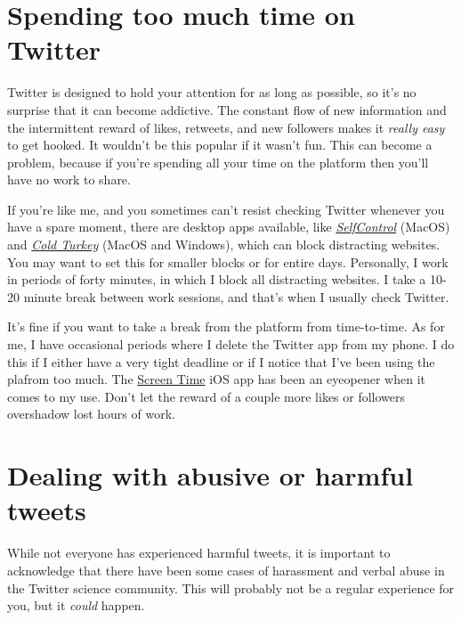 \documentclass[
]{book}
\begin{document}
\hypertarget{spending-too-much-time-on-twitter}{%
\section*{Spending too much time on Twitter}\label{spending-too-much-time-on-twitter}}

Twitter is designed to hold your attention for as long as possible, so it's no surprise that it can become addictive. The constant flow of new information and the intermittent reward of likes, retweets, and new followers makes it \emph{really easy} to get hooked. It wouldn't be this popular if it wasn't fun. This can become a problem, because if you're spending all your time on the platform then you'll have no work to share.

If you're like me, and you sometimes can't resist checking Twitter whenever you have a spare moment, there are desktop apps available, like \href{https://selfcontrolapp.com/}{\emph{SelfControl}} (MacOS) and \href{https://getcoldturkey.com/}{\emph{Cold Turkey}} (MacOS and Windows), which can block distracting websites. You may want to set this for smaller blocks or for entire days. Personally, I work in periods of forty minutes, in which I block all distracting websites. I take a 10-20 minute break between work sessions, and that's when I usually check Twitter.

It's fine if you want to take a break from the platform from time-to-time. As for me, I have occasional periods where I delete the Twitter app from my phone. I do this if I either have a very tight deadline or if I notice that I've been using the plafrom too much. The \href{https://support.apple.com/en-us/HT208982}{Screen Time} iOS app has been an eyeopener when it comes to my use. Don't let the reward of a couple more likes or followers overshadow lost hours of work.

\hypertarget{dealing-with-abusive-or-harmful-tweets}{%
\section*{Dealing with abusive or harmful tweets}\label{dealing-with-abusive-or-harmful-tweets}}

While not everyone has experienced harmful tweets, it is important to acknowledge that there have been some cases of harassment and verbal abuse in the Twitter science community. This will probably not be a regular experience for you, but it \emph{could} happen.
\end{document}
